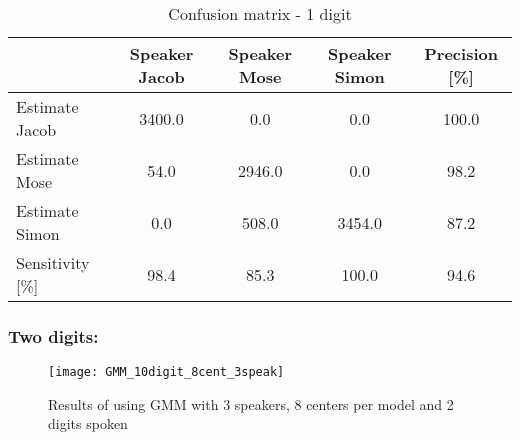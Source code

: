 \begin{table}[H]                                                   
\centering                                                          
\begin{tabular}{|l|c|c|c|c|}                                        
\hline                                                              
  & Speaker Jacob & Speaker Mose & Speaker Simon & Precision [\%] \\
\hline                                                              
Estimate Jacob & 3400.0 & 0.0 & 0.0 & 100.0 \\                      
\hline                                                              
Estimate Mose & 54.0 & 2946.0 & 0.0 & 98.2 \\                       
\hline                                                              
Estimate Simon & 0.0 & 508.0 & 3454.0 & 87.2 \\                     
\hline                                                              
Sensitivity [\%] & 98.4 & 85.3 & 100.0 & 94.6 \\                    
\hline                                                              
\end{tabular}                                                       
\caption{Confusion matrix - 1 digit}                                
\label{table:GMM_conf_1}                                            
\end{table} 


\subsubsection{Two digits:}
\begin{figure}[H]
\centering
\texttt{[image: GMM\_10digit\_8cent\_3speak]}
\caption{Results of using GMM with 3 speakers, 8 centers per model and 2 digits spoken}
\label{fig:GMM_fig_2}
\end{figure}

